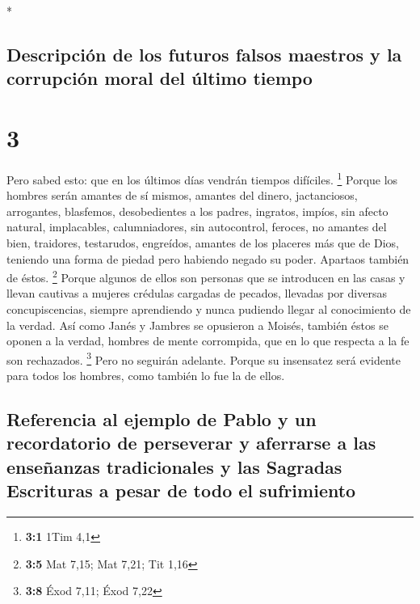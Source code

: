 \begin{paracol}{2}
\begin{otherlanguage}{english}
\end{otherlanguage}

\switchcolumn[0]*

\hypertarget{descripciuxf3n-de-los-futuros-falsos-maestros-y-la-corrupciuxf3n-moral-del-uxfaltimo-tiempo}{%
\subsection{Descripción de los futuros falsos maestros y la corrupción
moral del último
tiempo}\label{descripciuxf3n-de-los-futuros-falsos-maestros-y-la-corrupciuxf3n-moral-del-uxfaltimo-tiempo}}

\hypertarget{section-4}{%
\section{3}\label{section-4}}

 Pero sabed esto: que en los últimos días vendrán tiempos
difíciles. \footnote{\textbf{3:1} 1Tim 4,1}  Porque los
hombres serán amantes de sí mismos, amantes del dinero, jactanciosos,
arrogantes, blasfemos, desobedientes a los padres, ingratos, impíos,
 sin afecto natural, implacables, calumniadores, sin
autocontrol, feroces, no amantes del bien,  traidores,
testarudos, engreídos, amantes de los placeres más que de Dios,
 teniendo una forma de piedad pero habiendo negado su
poder. Apartaos también de éstos. \footnote{\textbf{3:5} Mat 7,15; Mat
  7,21; Tit 1,16}  Porque algunos de ellos son personas
que se introducen en las casas y llevan cautivas a mujeres crédulas
cargadas de pecados, llevadas por diversas concupiscencias,
 siempre aprendiendo y nunca pudiendo llegar al
conocimiento de la verdad.  Así como Janés y Jambres se
opusieron a Moisés, también éstos se oponen a la verdad, hombres de
mente corrompida, que en lo que respecta a la fe son rechazados.
\footnote{\textbf{3:8} Éxod 7,11; Éxod 7,22}  Pero no
seguirán adelante. Porque su insensatez será evidente para todos los
hombres, como también lo fue la de ellos.

\hypertarget{referencia-al-ejemplo-de-pablo-y-un-recordatorio-de-perseverar-y-aferrarse-a-las-enseuxf1anzas-tradicionales-y-las-sagradas-escrituras-a-pesar-de-todo-el-sufrimiento}{%
\subsection{Referencia al ejemplo de Pablo y un recordatorio de
perseverar y aferrarse a las enseñanzas tradicionales y las Sagradas
Escrituras a pesar de todo el
sufrimiento}\label{referencia-al-ejemplo-de-pablo-y-un-recordatorio-de-perseverar-y-aferrarse-a-las-enseuxf1anzas-tradicionales-y-las-sagradas-escrituras-a-pesar-de-todo-el-sufrimiento}}


\end{paracol}
